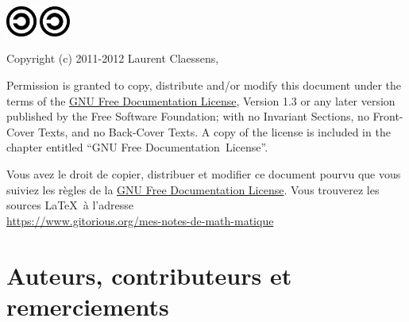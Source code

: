 \begin{center}

           \ifpdf
            \includegraphics[width=1cm]{Copyleft.png}
        \else
            \includegraphics[width=1cm]{Copyleft.eps}
        \fi

Copyright (c) 2011-2012  Laurent Claessens,

Permission is granted to copy, distribute and/or modify this document under the terms of the \href{http://www.gnu.org/licenses/fdl-1.3.html}{GNU Free Documentation License}, Version 1.3 or any later version published by the Free Software Foundation; with no Invariant Sections, no Front-Cover Texts, and no Back-Cover Texts. A copy of the license is included in the chapter entitled ``GNU Free Documentation~License''.

Vous avez le droit de copier, distribuer et modifier ce document pourvu que vous suiviez les règles de la \href{http://www.gnu.org/licenses/fdl-1.3.html}{GNU Free Documentation License}. Vous trouverez les sources \LaTeX\ à l'adresse\\ \url{https://www.gitorious.org/mes-notes-de-math-matique}




\end{center}

\clearpage

\section*{Auteurs, contributeurs et remerciements}

